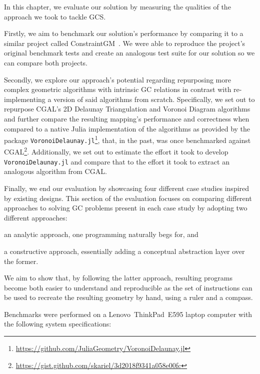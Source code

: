 %
\label{chap:eval}
\cleardoublepage{}

\noindent In this chapter, we evaluate our solution by measuring the qualities
of the approach we took to tackle \ac{GCS}.

Firstly, we aim to benchmark our solution's performance by comparing it to a
similar project called ConstraintGM~\cite{Pinheiro:2016:MGR}.  We were able to
reproduce the project's original benchmark tests and create an analogous test
suite for our solution so we can compare both projects.

Secondly, we explore our approach's potential regarding repurposing more complex
geometric algorithms with intrinsic \ac{GC} relations in contrast with
re-implementing a version of said algorithms from scratch.  Specifically, we set
out to repurpose \ac{CGAL}'s 2D Delaunay Triangulation and Voronoi Diagram
algorithms and further compare the resulting mapping's performance and
correctness when compared to a native Julia implementation of the algorithms as
provided by the package
\texttt{VoronoiDelaunay.jl}\footnote{\url{https://github.com/JuliaGeometry/VoronoiDelaunay.jl}},
that, in the past, was once benchmarked against
\ac{CGAL}\footnote{\url{https://gist.github.com/skariel/3d2018f9341a058e00fc}}.
Additionally, we set out to estimate the effort it took to develop
\texttt{VoronoiDelaunay.jl} and compare that to the effort it took to extract an
analogous algorithm from \ac{CGAL}.

Finally, we end our evaluation by showcasing four different case studies
inspired by existing designs.  This section of the evaluation focuses on
comparing different approaches to solving \ac{GC} problems present in each case
study by adopting two different approaches: 
\begin{enumerate*}[label= (\arabic*)]
  \item an analytic approach, one programming naturally begs for, and 
  \item a constructive approach, essentially adding a conceptual abstraction
  layer over the former.
\end{enumerate*}
We aim to show that, by following the latter approach, resulting programs become
both easier to understand and reproducible as the set of instructions can be
used to recreate the resulting geometry by hand, using a ruler and a compass.

Benchmarks were performed on a Lenovo\textsuperscript\textregistered\
ThinkPad\textsuperscript\textregistered\ E595 laptop computer with the following
system specifications:

